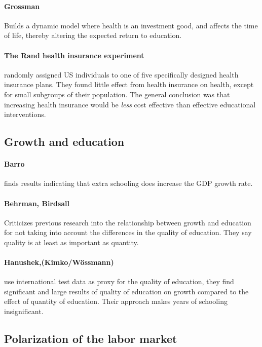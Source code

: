 \documentclass[12pt, a4paper]{article}
\begin{document}
\begin{multicols}{2}
\paragraph{Grossman} Builds a dynamic model where health is an investment good, and affects the time of life, thereby altering the expected return to education.

\paragraph{The Rand health insurance experiment} randomly assigned US individuals to one of five specifically designed health insurance plans. They found little effect from health insurance on health, except for small subgroups of their population. The general conclusion was that increasing health insurance would be \textit{less} cost effective than effective educational interventions. 

\subsection{Growth and education}

\paragraph{Barro} finds results indicating that extra schooling does increase the GDP growth rate.

\paragraph{Behrman, Birdsall} Criticizes previous research into the relationship between growth and education for not taking into account the differences in the quality of education. They say quality is at least as important as quantity. 

\paragraph{Hanushek,(Kimko/Wössmann)} use international test data as proxy for the quality of education, they find significant and large results of quality of education on growth compared to the effect of quantity of education. Their approach makes years of schooling insignificant.

\subsection{Polarization of the labor market}

\end{multicols}
\end{document}
